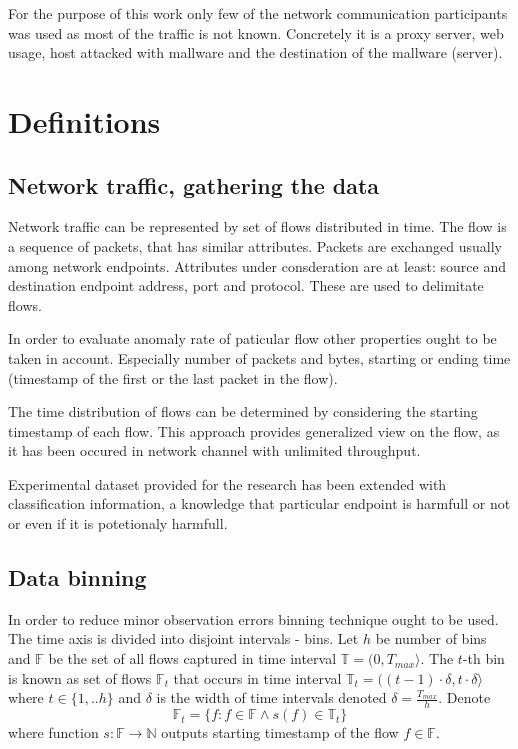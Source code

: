 \documentclass[a4paper]{IEEEtran}
\begin{document}
For the purpose of this work only few of the network communication participants was used as most of the traffic is not known.
Concretely it is a proxy server, web usage, host attacked with mallware and the destination of the mallware (server).

\section{Definitions}
\subsection{Network traffic, gathering the data}
Network traffic can be represented by set of flows distributed in time.
The flow is a sequence of packets, that has similar attributes. Packets
are exchanged usually among network endpoints. Attributes
under consderation are at least: source and destination endpoint address, port and
protocol. These are used to delimitate flows.

In order to evaluate anomaly rate of paticular flow other properties ought to be
taken in account. Especially number of packets and bytes, starting or ending time
(timestamp of the first or the last packet in the flow).

The time distribution of flows can be determined by considering the
starting timestamp of each flow. This approach provides generalized view on the flow, 
as it has been occured in network channel with unlimited throughput.

Experimental dataset provided for the research has been extended with
classification information, a knowledge that particular endpoint is 
harmfull or not or even if it is potetionaly harmfull.

\subsection{Data binning}
In order to reduce minor observation errors binning technique ought to be used.
The time axis is divided into disjoint intervals - bins.
Let $h$ be number of bins and $\mathbb{F}$ be the set of all flows captured in time interval
$\mathbb{T} = (0, T_{max}\rangle $. The $t$-th bin is known as 
set of flows $\mathbb{F}_t$ 
that occurs in time interval
$\mathbb{T}_t = ((t-1)\cdot \delta, t\cdot \delta\rangle $ where 
$t \in \{1, .. h\}$ and $\delta$ is the width of time intervals
denoted $\delta = \frac{T_{max}}{h}$.
Denote
\[
\mathbb{F}_t = \{f : f \in \mathbb{F} \wedge s(f) \in \mathbb{T}_t \}
\]
where function $s:\mathbb{F} \rightarrow \mathbb{N} $ 
outputs starting timestamp of the flow $f\in \mathbb{F}$.
\end{document}
